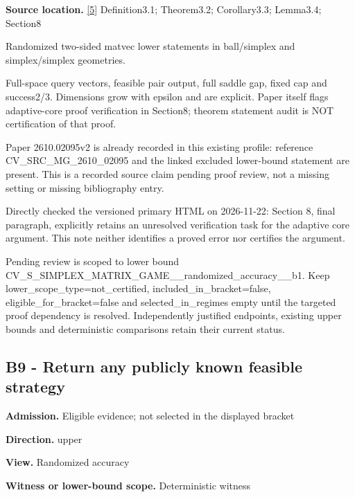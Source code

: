 \documentclass[10pt,a4paper]{article}
\begin{document}
\textbf{Source location.} \href{https://arxiv.org/pdf/2610.02095v2}{[5]} Definition3.1; Theorem3.2; Corollary3.3; Lemma3.4; Section8



Randomized two-sided matvec lower statements in ball/simplex and simplex/simplex geometries.



Full-space query vectors, feasible pair output, full saddle gap, fixed cap and success2/3. Dimensions grow with epsilon and are explicit. Paper itself flags adaptive-core proof verification in Section8; theorem statement audit is NOT certification of that proof.



Paper 2610.02095v2 is already recorded in this existing profile: reference CV\_SRC\_MG\_2610\_02095 and the linked excluded lower-bound statement are present. This is a recorded source claim pending proof review, not a missing setting or missing bibliography entry.



Directly checked the versioned primary HTML on 2026-11-22: Section 8, final paragraph, explicitly retains an unresolved verification task for the adaptive core argument. This note neither identifies a proved error nor certifies the argument.



Pending review is scoped to lower bound CV\_S\_SIMPLEX\_MATRIX\_GAME\allowbreak{}\_\_randomized\_accuracy\_\_b\allowbreak{}1. Keep lower\_scope\_type=not\_certified, included\_in\_bracket=false, eligible\_for\_bracket=false and selected\_in\_regimes empty until the targeted proof dependency is resolved. Independently justified endpoints, existing upper bounds and deterministic comparisons retain their current status.



\subsection{B9 - Return any publicly known feasible strategy}


\textbf{Admission.} Eligible evidence; not selected in the displayed bracket



\textbf{Direction.} upper



\textbf{View.} Randomized accuracy



\textbf{Witness or lower-bound scope.} Deterministic witness
\end{document}
